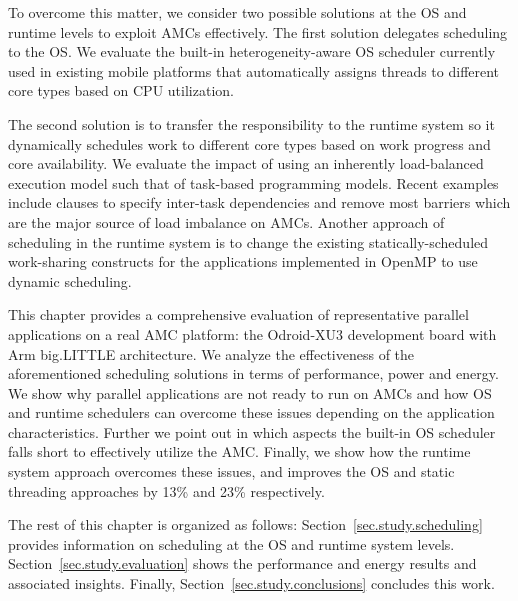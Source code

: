 To overcome this matter, we consider two possible solutions at the OS and runtime levels to exploit AMCs effectively.
The first solution delegates scheduling to the OS.
We evaluate the built-in heterogeneity-aware OS scheduler currently used in existing mobile platforms that automatically assigns threads to different core types based on CPU utilization. 

The second solution is to transfer the responsibility to the runtime system so it dynamically schedules work to different core types based on work progress and core availability. 
We evaluate the impact of using an inherently load-balanced execution model such that of task-based programming models. 
Recent examples~\cite{Ayguade:TPDS2009, OpenMP4.0:Manual2013, OmpSs_PPL11, vectorMulticore, Bauer.2012.SC,rollback,Vandierendonck:PACT2011, Vandierendonck:Hyperq,spawn} include clauses to specify inter-task dependencies and remove most barriers which are the major source of load imbalance on AMCs.
Another approach of scheduling in the runtime system is to change the existing statically-scheduled work-sharing constructs for the applications implemented in OpenMP to use dynamic scheduling. 

This chapter provides a comprehensive evaluation of representative parallel applications on a real AMC platform: the Odroid-XU3 development board with Arm big.LITTLE architecture.
We analyze the effectiveness of the aforementioned scheduling solutions in terms of performance, power and energy.
We show why parallel applications are not ready to run on AMCs and how OS and runtime schedulers can overcome these issues depending on the application characteristics.
Further we point out in which aspects the built-in OS scheduler falls short to effectively utilize the AMC.
Finally, we show how the runtime system approach overcomes these issues, and improves the OS and static threading approaches by 13\% and 23\% respectively.

The rest of this chapter is organized as follows: Section~\ref{sec.study.scheduling} provides information on 
scheduling at the OS and runtime system levels.
Section~\ref{sec.study.evaluation} shows the performance and energy results and associated insights.%
Finally, Section~\ref{sec.study.conclusions} concludes this work. 

